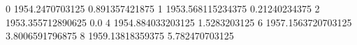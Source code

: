 0 1954.2470703125 0.891357421875
1 1953.568115234375 0.21240234375
2 1953.355712890625 0.0
4 1954.884033203125 1.5283203125
6 1957.1563720703125 3.8006591796875
8 1959.13818359375 5.782470703125
